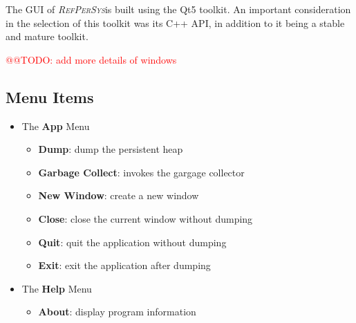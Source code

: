 \documentclass[11pt,a4paper,svgnames]{article}
\newcommand{\RefPerSys}{{\textit{\textsc{RefPerSys}}}}
\begin{document}
The GUI of \RefPerSys is built using the Qt5 toolkit. An important consideration
in the selection of this toolkit was its C++ API, in addition to it being a stable
and mature toolkit.

\textcolor{red}{@@TODO: add more details of windows}

\subsection{Menu Items}
\label{subsec:gui-menu}

\begin{itemize}
  \item The \textbf{App} Menu
    \begin{itemize}
      \item \textbf{Dump}: dump the persistent heap
      \item \textbf{Garbage Collect}: invokes the gargage collector
      \item \textbf{New Window}: create a new window
      \item \textbf{Close}: close the current window without dumping
      \item \textbf{Quit}: quit the application without dumping
      \item \textbf{Exit}: exit the application after dumping
    \end{itemize}
  \item The \textbf{Help} Menu
    \begin{itemize}
      \item \textbf{About}: display program information
    \end{itemize}
\end{itemize}

\label{subsec:data-format}
\clearpage
\printnoidxglossaries
\bigskip
\printbibliography
\bigskip
\printindex
\end{document}
